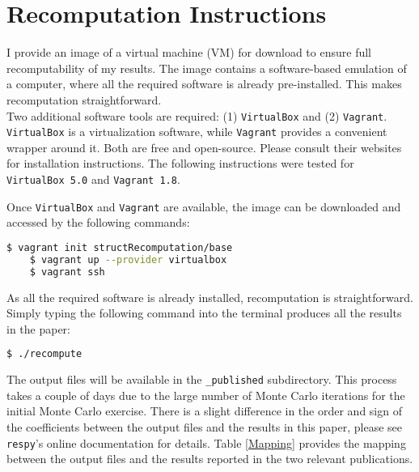 \section{Recomputation Instructions}
I provide an image of a virtual machine (VM) for download to ensure full recomputability of my results. The image contains a software-based emulation of a computer, where all the required software is already pre-installed. This makes recomputation straightforward.\\\newline
%
Two additional software tools are required: (1)  \texttt{VirtualBox} and (2) \texttt{Vagrant}. \texttt{VirtualBox} is a virtualization software, while \texttt{Vagrant} provides a convenient wrapper around it. Both are free and open-source. Please consult their websites for installation instructions. The following instructions were tested for \texttt{VirtualBox 5.0} and \texttt{Vagrant 1.8}.\newline

Once \texttt{VirtualBox} and \texttt{Vagrant} are available, the image can be downloaded and accessed by the following commands:

\vspace{0.2cm}\begin{lstlisting}[language=bash]
    $ vagrant init structRecomputation/base
    $ vagrant up --provider virtualbox
    $ vagrant ssh
\end{lstlisting}\vspace{0.2cm}

As all the required software is already installed, recomputation is straightforward. Simply typing the following command into the terminal produces all the results in the paper:
\vspace{0.2cm}\begin{lstlisting}[language=bash]
    $ ./recompute
\end{lstlisting}\vspace{0.2cm}

The output files will be available in the \verb+_published+ subdirectory. This process takes a couple of days due to the large number of Monte Carlo iterations for the initial Monte Carlo exercise. There is a slight difference in the order and sign of the coefficients between the output files and the results in this paper, please see  \verb+respy+'s online documentation for details. Table \ref{Mapping} provides the mapping between the output files and the results reported in the two relevant publications.



